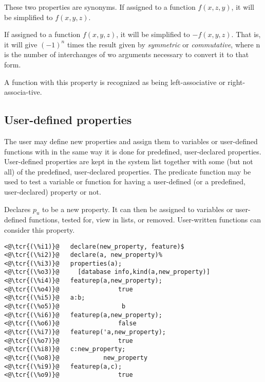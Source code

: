 \documentclass[../Maxima_Workbook.tex]{subfiles}
\begin{document}
\lzz {} \hfill \tcr{[property]}

 \hfill \tcr{[property]}

\lz These two properties are synonyms. If assigned to a function $f(x,z,y)$, it will be simplified to $ f(x,y,z) $. 

\lzz {} \hfill \tcr{[property]}

\lz If assigned to a function $f(x,y,z)$, it will be simplified to $ -f(x,y,z) $. That is, it will give $ (-1)^n $ times the result given by \emph{symmetric} or \emph{commutative}, where n is the number of interchanges of wo arguments necessary to convert it to that form.

\lzz {} \hfill \tcr{[property]}

 \hfill \tcr{[property]}

\lz A function with this property is recognized as being left-associative or right-associa-tive.


\subsection{User-defined properties}\label{Db4}

The user may define new properties and assign them to variables or user-defined functions with  in the same way it is done for predefined, user-declared properties. User-defined properties are kept in the system list  together with some (but not all) of the predefined, user-declared properties. The predicate function  may be used to test a variable or function for having a user-defined (or a predefined, user-declared) property or not.

\lzz {} \hfill \tcr{[function]}

\lz Declares $ p_u $ to be a new property. It can then be assigned to variables or user-defined functions, tested for, view in lists, or removed. User-written functions can consider this property.

\lz \begin{lstlisting}
<@\tcr{(\%i1)}@   declare(new_property, feature)$
<@\tcr{(\%i2)}@   declare(a, new_property)%
<@\tcr{(\%i3)}@   properties(a);
<@\tcr{(\%o3)}@		[database info,kind(a,new_property)]
<@\tcr{(\%i4)}@   featurep(a,new_property);
<@\tcr{(\%o4)}@			       true
<@\tcr{(\%i5)}@   a:b;
<@\tcr{(\%o5)}@			        b
<@\tcr{(\%i6)}@   featurep(a,new_property);
<@\tcr{(\%o6)}@			       false
<@\tcr{(\%i7)}@   featurep('a,new_property);
<@\tcr{(\%o7)}@			       true
<@\tcr{(\%i8)}@   c:new_property;
<@\tcr{(\%o8)}@			   new_property
<@\tcr{(\%i9)}@   featurep(a,c);
<@\tcr{(\%o9)}@			       true
\end{lstlisting}
\end{document}
